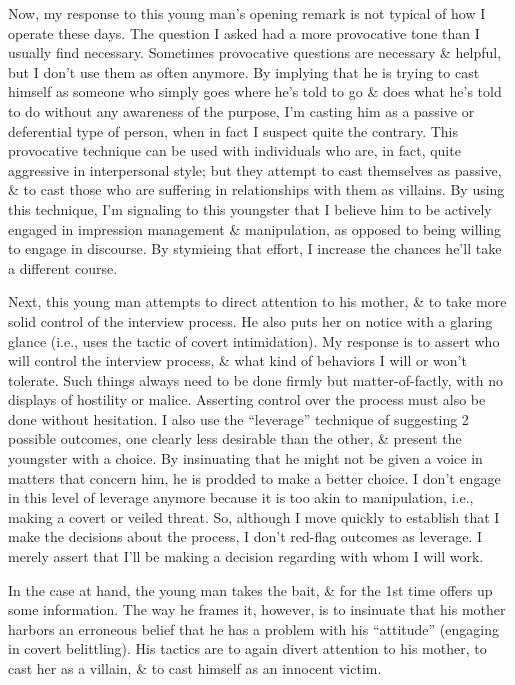 \documentclass{article}
\numberwithin{equation}{section}
\begin{document}
Now, my response to this young man's opening remark is not typical of how I operate these days. The question I asked had a more provocative tone than I usually find necessary. Sometimes provocative questions are necessary \& helpful, but I don't use them as often anymore. By implying that he is trying to cast himself as someone who simply goes where he's told to go \& does what he's told to do without any awareness of the purpose, I'm casting him as a passive or deferential type of person, when in fact I suspect quite the contrary. This provocative technique can be used with individuals who are, in fact, quite aggressive in interpersonal style; but they attempt to cast themselves as passive, \& to cast those who are suffering in relationships with them as villains. By using this technique, I'm signaling to this youngster that I believe him to be actively engaged in impression management \& manipulation, as opposed to being willing to engage in discourse. By stymieing that effort, I increase the chances he'll take a different course.

Next, this young man attempts to direct attention to his mother, \& to take more solid control of the interview process. He also puts her on notice with a glaring glance (i.e., uses the tactic of covert intimidation). My response is to assert who will control the interview process, \& what kind of behaviors I will or won't tolerate. Such things always need to be done firmly but matter-of-factly, with no displays of hostility or malice. Asserting control over the process must also be done without hesitation. I also use the ``leverage'' technique of suggesting 2 possible outcomes, one clearly less desirable than the other, \& present the youngster with a choice. By insinuating that he might not be given a voice in matters that concern him, he is prodded to make a better choice. I don't engage in this level of leverage anymore because it is too akin to manipulation, i.e., making a covert or veiled threat. So, although I move quickly to establish that I make the decisions about the process, I don't red-flag outcomes as leverage. I merely assert that I'll be making a decision regarding with whom I will work.

In the case at hand, the young man takes the bait, \& for the 1st time offers up some information. The way he frames it, however, is to insinuate that his mother harbors an erroneous belief that he has a problem with his ``attitude'' (engaging in covert belittling). His tactics are to again divert attention to his mother, to cast her as a villain, \& to cast himself as an innocent victim.
\end{document}
